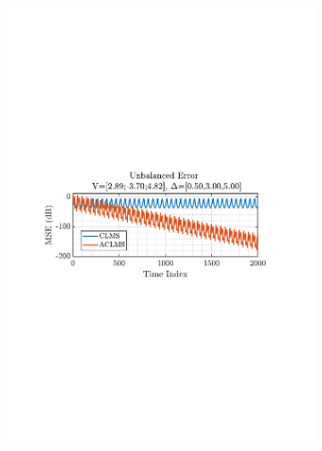 \documentclass[12pt]{article}
\begin{document}
\begin{figure}[H]
				\begin{subfigure}{0.49\textwidth}
					\centering
					\includegraphics[trim={2.2cm 11.2cm 3.00cm  11.2cm}, clip, width=\textwidth]{../MATLAB/figures/q3_1e_fig03.pdf} 
					\captionsetup{justification=centering}
				\end{subfigure}
				\begin{subfigure}{0.49\textwidth}
					\centering

\end{subfigure}
\end{figure}
\end{document}
